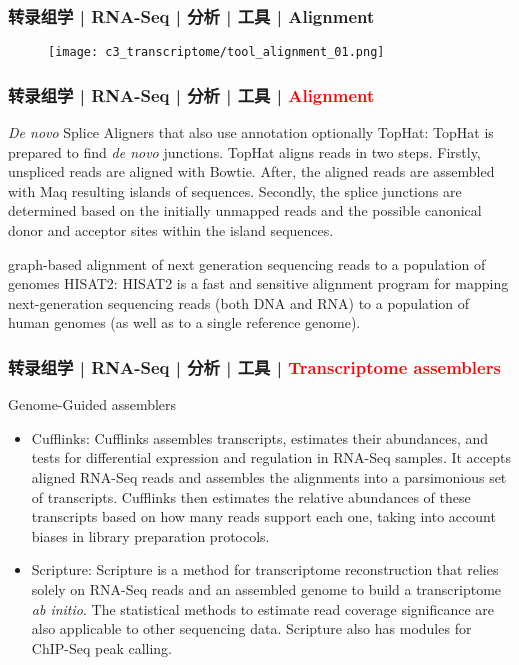 \begin{frame}
  \frametitle{转录组学 | RNA-Seq | 分析 | 工具 | Alignment}
  \begin{figure}
    \centering
    \texttt{[image: c3\_transcriptome/tool\_alignment\_01.png]}
  \end{figure}
\end{frame}

\begin{frame}
  \frametitle{转录组学 | RNA-Seq | 分析 | 工具 | \textcolor{red}{Alignment}}
  \begin{block}{\textit{De novo} Splice Aligners that also use annotation optionally}
    TopHat: TopHat is prepared to find \textit{de novo} junctions. TopHat aligns reads in two steps. Firstly, unspliced reads are aligned with Bowtie. After, the aligned reads are assembled with Maq resulting islands of sequences. Secondly, the splice junctions are determined based on the initially unmapped reads and the possible canonical donor and acceptor sites within the island sequences.
  \end{block}
  \pause
  \begin{block}{graph-based alignment of next generation sequencing reads to a population of genomes}
    HISAT2: HISAT2 is a fast and sensitive alignment program for mapping next-generation sequencing reads (both DNA and RNA) to a population of human genomes (as well as to a single reference genome).
  \end{block}
\end{frame}

\begin{frame}
  \frametitle{转录组学 | RNA-Seq | 分析 | 工具 | \textcolor{red}{Transcriptome assemblers}}
  \begin{block}{Genome-Guided assemblers}
    \begin{itemize}
      \item Cufflinks: Cufflinks assembles transcripts, estimates their abundances, and tests for differential expression and regulation in RNA-Seq samples. It accepts aligned RNA-Seq reads and assembles the alignments into a parsimonious set of transcripts. Cufflinks then estimates the relative abundances of these transcripts based on how many reads support each one, taking into account biases in library preparation protocols.
      \item Scripture: Scripture is a method for transcriptome reconstruction that relies solely on RNA-Seq reads and an assembled genome to build a transcriptome \textit{ab initio}. The statistical methods to estimate read coverage significance are also applicable to other sequencing data. Scripture also has modules for ChIP-Seq peak calling.
    \end{itemize}
  \end{block}
\end{frame}

